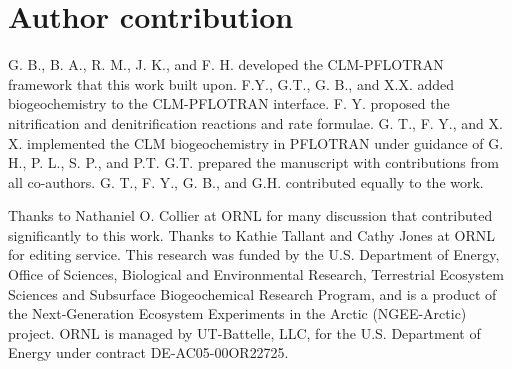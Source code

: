 \documentclass[gmd, manuscript]{copernicus}
\begin{document}
\section{Author contribution}
G. B., B. A., R. M., J. K., and F. H. developed the CLM-PFLOTRAN framework that this
work built upon. F.Y., G.T., G. B., and X.X. added biogeochemistry to the CLM-PFLOTRAN
interface. F. Y. proposed the nitrification and denitrification reactions and
rate formulae. G. T., F. Y., and X. X. implemented the CLM
biogeochemistry in PFLOTRAN under guidance of G. H., P. L., S. P., and P.T.
G.T. prepared the manuscript with contributions from all co-authors. 
G. T., F. Y., G. B., and G.H. contributed equally to the work.  

\begin{acknowledgements}
Thanks to Nathaniel O. Collier at ORNL for many discussion that contributed significantly to this work.
Thanks to Kathie Tallant and Cathy Jones at ORNL for editing service. This research was funded by the U.S. Department of Energy, Office of Sciences,
Biological and Environmental Research, Terrestrial Ecosystem Sciences and
Subsurface Biogeochemical Research Program, and is a product of the
Next-Generation Ecosystem Experiments in the Arctic (NGEE-Arctic) project.
ORNL is managed by UT-Battelle, LLC, for the U.S. Department of Energy under
contract DE-AC05-00OR22725.
\end{acknowledgements}











%
\end{document}
